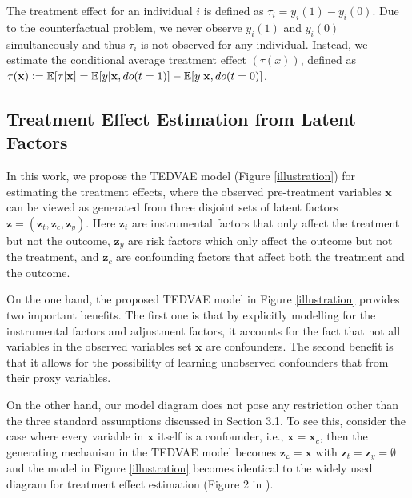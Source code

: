 \documentclass[letterpaper]{article} %
\begin{document}
The treatment effect for an individual $i$ is defined as $\tau_i = y_i(1) - y_i(0)$.
Due to the counterfactual problem, we never observe $y_i(1)$ and $y_i(0)$ simultaneously and thus $\tau_i$ is not observed for any individual. Instead, we estimate the conditional average treatment effect $(\tau(x))$, defined as $\tau(\mathbf{x}) \vcentcolon = \mathbb{E}[\tau|\mathbf{x}] =  \mathbb{E}[y|\mathbf{x}, do(t=1)] - \mathbb{E}[y|\mathbf{x},do(t=0)]$.


\subsection*{Treatment Effect Estimation from Latent Factors}


In this work, we propose the TEDVAE model (Figure \ref{illustration}) for estimating the treatment effects, where the observed pre-treatment variables $\mathbf{x}$ can be viewed as generated from three disjoint sets of latent factors $\mathbf{z} = (\mathbf{z}_t,\mathbf{z}_c, \mathbf{z}_y)$.
Here $\mathbf{z}_t$ are instrumental factors that only affect the treatment but not the outcome,
$\mathbf{z}_y$ are risk factors which only affect the outcome but not the treatment,
and $\mathbf{z}_c$ are confounding factors that affect both the treatment and the outcome.

On the one hand, the proposed TEDVAE model in Figure \ref{illustration} provides two important benefits. The first one is that by explicitly modelling for the instrumental factors and adjustment factors, it accounts for the fact that not all variables in the observed variables set $\mathbf{x}$ are confounders. The second benefit is that it allows for the possibility of learning unobserved confounders that from their proxy variables.

On the other hand, our model diagram does not pose any restriction other than the three standard assumptions discussed in Section 3.1.
To see this, consider the case where every variable in $\mathbf{x}$ itself is a confounder, i.e., $\mathbf{x}=\mathbf{x}_c$, then the generating mechanism in the TEDVAE model becomes $\mathbf{z_c} = \mathbf{x}$ with $\mathbf{z}_t=\mathbf{z}_y=\emptyset$ and the model in Figure \ref{illustration} becomes identical to the widely used diagram for treatment effect estimation (Figure 2 in \cite{Imbens2019}).
\end{document}
